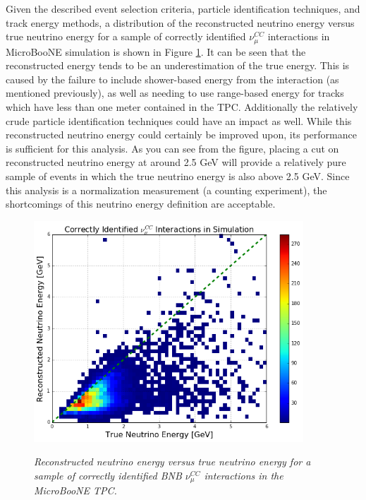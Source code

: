 Given the described event selection criteria, particle identification techniques, and track energy methods, a distribution of the reconstructed neutrino energy versus true neutrino energy for a sample of correctly identified $\nu_\mu^{CC}$ interactions in MicroBooNE simulation is shown in Figure \ref{kaon_recoenergy_2d_fig}. It can be seen that the reconstructed energy tends to be an underestimation of the true energy. This is caused by the failure to include shower-based energy from the interaction (as mentioned previously), as well as needing to use range-based energy for tracks which have less than one meter contained in the TPC. Additionally the relatively crude particle identification techniques could have an impact as well. While this reconstructed neutrino energy could certainly be improved upon, its performance is sufficient for this analysis. As you can see from the figure, placing a cut on reconstructed neutrino energy at around 2.5 GeV will provide a relatively pure sample of events in which the true neutrino energy is also above 2.5 GeV. Since this analysis is a normalization measurement (a counting experiment), the shortcomings of this neutrino energy definition are acceptable.

\begin{figure}[ht!]
\centering
	\includegraphics[width=0.9\textwidth]{Figures/kaon_recoenergy_2d.png} \\
\caption{\textit{Reconstructed neutrino energy versus true neutrino energy for a sample of correctly identified BNB $\nu_\mu^{CC}$ interactions in the MicroBooNE TPC.}}\label{kaon_recoenergy_2d_fig}
\end{figure}

